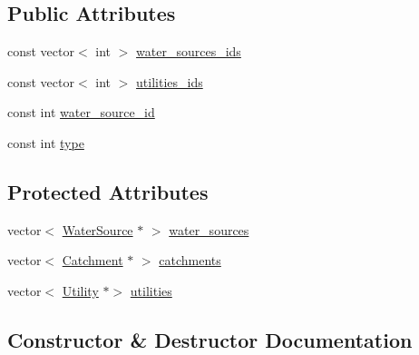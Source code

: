 \subsection*{Public Attributes}
\begin{DoxyCompactItemize}
\item 
const vector$<$ int $>$ \mbox{\hyperlink{classMinEnvironFlowControl_a1544571a77557853d0cc8189bd29f4b3}{water\+\_\+sources\+\_\+ids}}
\item 
const vector$<$ int $>$ \mbox{\hyperlink{classMinEnvironFlowControl_ae5acc488f8a0b8aaf7a85cfc8a25bbf9}{utilities\+\_\+ids}}
\item 
const int \mbox{\hyperlink{classMinEnvironFlowControl_a571d4d56086eb752aebb20b2d85fa8e7}{water\+\_\+source\+\_\+id}}
\item 
const int \mbox{\hyperlink{classMinEnvironFlowControl_a1a10a6b5720c934eef698cd72c9d883c}{type}}
\end{DoxyCompactItemize}
\subsection*{Protected Attributes}
\begin{DoxyCompactItemize}
\item 
vector$<$ \mbox{\hyperlink{classWaterSource}{Water\+Source}} $\ast$ $>$ \mbox{\hyperlink{classMinEnvironFlowControl_ac5be281d802ad1de433bed588bb13cfe}{water\+\_\+sources}}
\item 
vector$<$ \mbox{\hyperlink{classCatchment}{Catchment}} $\ast$ $>$ \mbox{\hyperlink{classMinEnvironFlowControl_a3d55c77bc8ba49b14b20eb494868b3ce}{catchments}}
\item 
vector$<$ \mbox{\hyperlink{classUtility}{Utility}} $\ast$$>$ \mbox{\hyperlink{classMinEnvironFlowControl_a6c43408d05901838fa567c8e23a37009}{utilities}}
\end{DoxyCompactItemize}


\subsection{Constructor \& Destructor Documentation}
\mbox{\label{classMinEnvironFlowControl_a5b40c3f8da8c63513edb30804bf2ca01}} 
